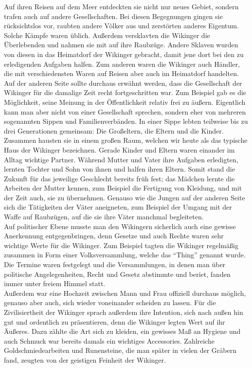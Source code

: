 \documentclass[twoside,12pt,a4paper,ngerman,openany]{book}
\begin{document}
Auf ihren Reisen auf dem Meer entdeckten sie nicht nur neues Gebiet, sondern trafen auch auf andere Gesellschaften. Bei diesen Begegnungen gingen sie rücksichtslos vor, raubten andere Völker aus und zerstörten anderes Eigentum.
Solche Kämpfe waren üblich. Außerdem versklavten die Wikinger die Überlebenden und nahmen sie mit auf ihre Raubzüge. Andere Sklaven wurden von diesen in das Heimatdorf der Wikinger gebracht, damit jene dort bei den zu erledigenden Aufgaben halfen.
Zum anderen waren die Wikinger auch Händler, die mit verschiedensten Waren auf Reisen aber auch im Heimatdorf handelten.\\
Auf der anderen Seite sollte durchaus erwähnt werden, dass die Gesellschaft der Wikinger für die damalige Zeit recht fortgeschritten war. Zum Beispiel gab es die Möglichkeit, seine Meinung in der Öffentlichkeit relativ frei zu äußern.
Eigentlich kann man aber nicht von einer Gesellschaft sprechen, sondern eher von mehreren sogenannten Sippen und Familienverbänden. In einer Sippe lebten teilweise bis zu drei Generationen gemeinsam: Die Großeltern, die Eltern und die Kinder.
Zusammen hausten sie in einem großen Raum, welchen wir heute als das typische Haus der Wikinger bezeichnen. Gerade Kinder und Eltern waren einander im Alltag wichtige Partner. Während Mutter und Vater ihre Aufgaben erledigten,
lernten Tochter und Sohn von ihnen und halfen ihren Eltern. Somit stand die Zukunft für das jeweilige Geschlecht bereits früh fest; das Mädchen lernte die Arbeiten der Mutter kennen, zum Beispiel die Fertigung von Kleidung, und mit der Zeit auch, sie zu übernehmen.
Genauso wie die Jungen auf der anderen Seite sich die Tätigkeiten der Väter aneigneten, zum Beispiel der Umgang mit der Waffe auf Raubzügen, auf die sie ihre Väter manchmal begleiteten.\\
Auf politischer Ebene musste man den Wikingern sicherlich auch eine gewisse Anerkennung entgegenbringen, denn Gesetze und auch Rechte waren sehr wichtige Werte für die Wikinger. Zum Beispiel tagten die Wikinger regelmäßig zusammen in Form einer Volksversammlung,
welche das “Thing” genannt wurde. Die Termine waren festgelegt und die Versammlungen, in denen man über politische Angelegenheiten, Recht und Gesetz abstimmte und beriet, fanden immer unter freiem Himmel statt.\\
Außerdem war eine Hochzeit zwischen Mann und Frau offiziell durchaus möglich, genauso aber auch, sich wieder voneinander scheiden zu lassen. 
Für die Zivilisiertheit der Wikinger sprach außerdem ihre Intention, sich nach außen hin gut und ordentlich zu präsentieren, denn die Wikinger legten Wert auf ihr Äußeres. Dazu zählte die Art sich zu kleiden,
ein gewisses Maß an Hygiene und auch Schmuck war bereits damals ein wichtiges Accessories. Zahlreiche Goldschmiedearbeiten und Runensteine, die man später in vielen der Gräbern fand, zeugten von der geistigen Feinheit der Wikinger. 
\end{document}
